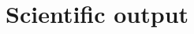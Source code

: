\documentclass[11pt,a4paper,sans]{moderncv}
\begin{document}





\section{Scientific output}
\end{document}
